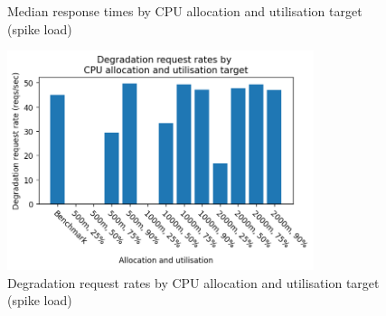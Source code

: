 \begin{figure}[h]
    \caption{Median response times by CPU allocation and utilisation target (spike load)}
    \label{figure:uor-resource-allocation-rt-comp-spike}
\end{figure}

\begin{figure}[h]
    \centering
    \includegraphics[width=0.8\textwidth]{figures/uor-rau-spike-degradation-reqs.png}
    \caption{Degradation request rates by CPU allocation and utilisation target (spike load)}
    \label{figure:uor-resource-allocation-deg-comp-spike}
\end{figure}

